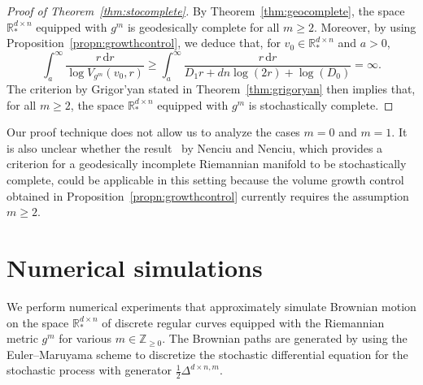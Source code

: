 \documentclass[11pt]{article}
\newcommand{\R}{\mathbb{R}}
\newcommand{\Z}{\mathbb{Z}}
\newcommand{\dd}{\,{\mathrm d}}
\begin{document}
\begin{proof}[Proof of Theorem~\ref{thm:stocomplete}]
    By Theorem~\ref{thm:geocomplete}, the space $\R_*^{d\times n}$ equipped with $g^m$ is geodesically complete for all $m\geq 2$. Moreover, by using Proposition~\ref{propn:growthcontrol}, we deduce that, for $v_0\in\R_*^{d\times n}$ and $a>0$,
    \begin{displaymath}
        \int_a^\infty\frac{r\dd r}{\log V_{g^m}(v_0,r)}
        \geq \int_a^\infty\frac{r\dd r}{D_1 r+dn\log\left(2r\right)+\log(D_0)}=\infty.
    \end{displaymath}
    The criterion by Grigor'yan stated in Theorem~\ref{thm:grigoryan} then implies that, for all $m\geq 2$, the space $\R_*^{d\times n}$ equipped with $g^m$ is stochastically complete.
\end{proof}

Our proof technique does not allow us to analyze the cases $m=0$ and $m=1$. It is also unclear whether the result~\cite[Theorem~4.2]{NN2} by Nenciu and Nenciu, which provides a criterion for a geodesically incomplete Riemannian manifold to be stochastically complete, could be applicable in this setting because the volume growth control obtained in Proposition~\ref{propn:growthcontrol} currently requires the assumption $m\geq 2$.

\section{Numerical simulations}\label{sec:simulations}
We perform numerical experiments that approximately simulate Brownian motion on the space $\mathbb{R}_*^{d\times n}$ of discrete regular curves equipped with the Riemannian metric $g^m$ for various $m\in\Z_{\geq 0}$. The Brownian paths are generated by using the Euler--Maruyama scheme to 
discretize the stochastic differential equation for the stochastic process with generator $\frac{1}{2}\Delta^{d\times n,m}$.
\end{document}
